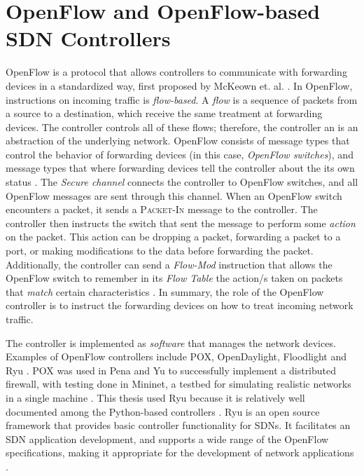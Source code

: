 \section{OpenFlow and OpenFlow-based SDN Controllers}
OpenFlow is a protocol that allows controllers to communicate with forwarding devices in a standardized way, first proposed by McKeown et. al. \cite{mckeown_openflow_2008}. In OpenFlow, instructions on incoming traffic is \textit{flow-based}. A \textit{flow} is a sequence of packets from a source to a destination, which receive the same treatment at forwarding devices. The controller controls all of these flows; therefore, the controller an is an abstraction of the underlying network. OpenFlow consists of message types that control the behavior of forwarding devices (in this case, \textit{OpenFlow switches}), and message types that where forwarding devices tell the controller about the its own status \cite{open_networking_foundation_openflow_2009}. The \textit{Secure channel} connects the controller to OpenFlow switches, and all OpenFlow messages are sent through this channel. When an OpenFlow switch encounters a packet, it sends a \textsc{Packet-In} message to the controller. The controller then instructs the switch that sent the message to perform some \textit{action} on the packet. This action can be dropping a packet, forwarding a packet to a port, or making modifications to the data before forwarding the packet. Additionally, the controller can send a \textit{Flow-Mod} instruction that allows the OpenFlow switch to remember in its \textit{Flow Table} the action/s taken on packets that \textit{match} certain characteristics \cite{open_networking_foundation_openflow_2009}. In summary, the role of the OpenFlow controller is to instruct the forwarding devices on how to treat incoming network traffic.

The controller is implemented as \textit{software} that manages the network devices. Examples of OpenFlow controllers include  POX, OpenDaylight, Floodlight and Ryu \cite{salman_sdn_2016}. POX was used in Pena and Yu \cite{pena_development_2014} to successfully implement a distributed firewall, with testing done in Mininet, a testbed for simulating realistic networks in a single machine \cite{noauthor_mininet_nodate}. This thesis used Ryu because it is relatively well documented among the Python-based controllers \cite{salman_sdn_2016}. Ryu is an open source framework that provides basic controller functionality for SDNs. It facilitates an SDN application development, and supports a wide range of the OpenFlow specifications, making it appropriate for the development of network applications \cite{kubo_ryu_2014}. 


